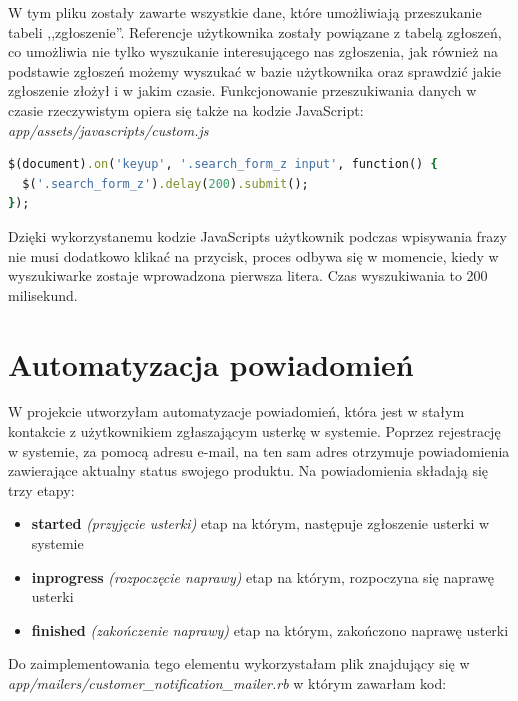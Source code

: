 \documentclass[openright]{xmgr}
\begin{document}
	W tym pliku zostały zawarte wszystkie dane, które umożliwiają przeszukanie tabeli ,,zgłoszenie''. Referencje użytkownika zostały powiązane z tabelą zgłoszeń, co umożliwia nie tylko wyszukanie interesującego nas zgłoszenia, jak również na podstawie zgłoszeń możemy wyszukać w bazie użytkownika oraz sprawdzić jakie zgłoszenie złożył i w jakim czasie.
	Funkcjonowanie przeszukiwania danych w czasie rzeczywistym opiera się także na kodzie JavaScript:\\
	
	\textit{app/assets/javascripts/custom.js}
	\begin{lstlisting}[language=Ruby,lineskip={-1pt},caption=JavaScripts - przeszukiwanie w czasie rzeczywistym]
$(document).on('keyup', '.search_form_z input', function() {
  $('.search_form_z').delay(200).submit();
});
	\end{lstlisting}
	
	Dzięki wykorzystanemu kodzie JavaScripts użytkownik podczas wpisywania frazy nie musi dodatkowo klikać na przycisk, proces odbywa się w momencie, kiedy w wyszukiwarke zostaje wprowadzona pierwsza litera. Czas wyszukiwania to 200 milisekund. 
	\newpage
	\section{Automatyzacja powiadomień}
	
	W projekcie utworzyłam automatyzacje powiadomień, która jest w stałym kontakcie z użytkownikiem zgłaszającym usterkę w systemie. Poprzez rejestrację w systemie, za pomocą adresu e-mail, na ten sam adres otrzymuje powiadomienia zawierające aktualny status swojego produktu. Na powiadomienia składają się trzy etapy:
	
	\begin{itemize}
		\item
		\textbf{started} \textit{(przyjęcie usterki)} etap na którym, następuje zgłoszenie usterki w systemie
		
		\item
		\textbf{inprogress} \textit{(rozpoczęcie naprawy)} etap na którym, rozpoczyna się naprawę usterki
		
		\item
		\textbf{finished} \textit{(zakończenie naprawy)} etap na którym, zakończono naprawę usterki
	\end{itemize}
	
	Do zaimplementowania tego elementu wykorzystałam plik znajdujący się w \textit{app/mailers/customer\_notification\_mailer.rb} w którym zawarłam kod:
	
\end{document}
